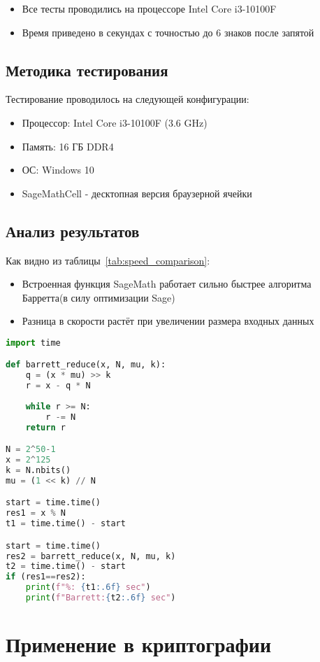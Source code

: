\documentclass[12pt,a4paper]{article}
\begin{document}
\begin{itemize}
\item Все тесты проводились на процессоре Intel Core i3-10100F
\item Время приведено в секундах с точностью до 6 знаков после запятой
\end{itemize}

\subsection{Методика тестирования}
Тестирование проводилось на следующей конфигурации:
\begin{itemize}
\item Процессор: Intel Core i3-10100F (3.6 GHz)
\item Память: 16 ГБ DDR4
\item ОС: Windows 10
\item SageMathCell - десктопная версия браузерной ячейки
\end{itemize}
\newpage
\subsection{Анализ результатов}

Как видно из таблицы~\ref{tab:speed_comparison}:
\begin{itemize}
\item Встроенная функция SageMath работает сильно быстрее алгоритма Барретта(в силу оптимизации Sage)
\item Разница в скорости растёт при увеличении размера входных данных
\end{itemize}

\begin{lstlisting}[language=Python,caption=Код для тестирования]
import time

def barrett_reduce(x, N, mu, k):   
    q = (x * mu) >> k  
    r = x - q * N
    
    while r >= N:
        r -= N
    return r

N = 2^50-1
x = 2^125
k = N.nbits()  
mu = (1 << k) // N  

start = time.time()
res1 = x % N
t1 = time.time() - start

start = time.time()
res2 = barrett_reduce(x, N, mu, k)
t2 = time.time() - start
if (res1==res2):
    print(f"%: {t1:.6f} sec")
    print(f"Barrett:{t2:.6f} sec")
\end{lstlisting}

\section{Применение в криптографии}
\end{document}
